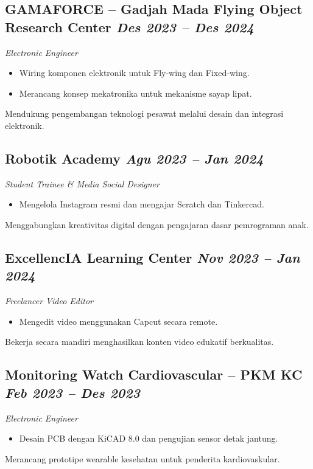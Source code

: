 \documentclass[a4paper,11pt]{article}
\begin{document}
	\subsection*{GAMAFORCE – Gadjah Mada Flying Object Research Center \hfill \textnormal{\textit{Des 2023 – Des 2024}}}
	\textit{Electronic Engineer}
	\begin{itemize}
		\item Wiring komponen elektronik untuk Fly-wing dan Fixed-wing.
		\item Merancang konsep mekatronika untuk mekanisme sayap lipat.
	\end{itemize}
	\noindent Mendukung pengembangan teknologi pesawat melalui desain dan integrasi elektronik.\\
	
	\subsection*{Robotik Academy \hfill \textnormal{\textit{Agu 2023 – Jan 2024}}}
	\textit{Student Trainee & Media Social Designer}
	\begin{itemize}
		\item Mengelola Instagram resmi dan mengajar Scratch dan Tinkercad.
	\end{itemize}
	\noindent Menggabungkan kreativitas digital dengan pengajaran dasar pemrograman anak.\\
	
	\subsection*{ExcellencIA Learning Center \hfill \textnormal{\textit{Nov 2023 – Jan 2024}}}
	\textit{Freelancer Video Editor}
	\begin{itemize}
		\item Mengedit video menggunakan Capcut secara remote.
	\end{itemize}
	\noindent Bekerja secara mandiri menghasilkan konten video edukatif berkualitas.\\
	
	\subsection*{Monitoring Watch Cardiovascular – PKM KC \hfill \textnormal{\textit{Feb 2023 – Des 2023}}}
	\textit{Electronic Engineer}
	\begin{itemize}
		\item Desain PCB dengan KiCAD 8.0 dan pengujian sensor detak jantung.
	\end{itemize}
	\noindent Merancang prototipe wearable kesehatan untuk penderita kardiovaskular.\\
	
\end{document}
